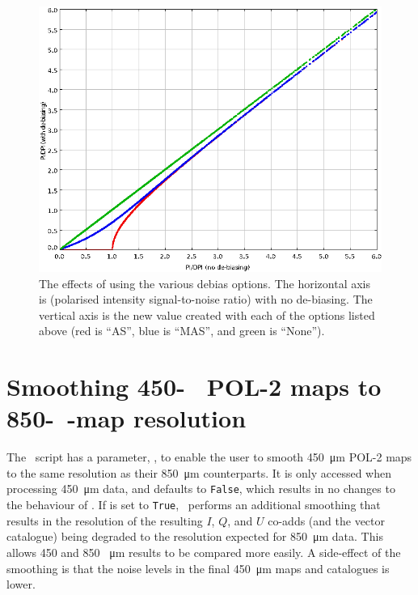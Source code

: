 \begin{figure}[ht!]
\begin{center}
\includegraphics[width=0.8\linewidth]{sc22-poledit-debias.png}
\caption [The effects of using the various  debias options]{
  The effects of using the various  debias options. The horizontal axis
  is  (polarised intensity signal-to-noise ratio) with no de-biasing. The vertical
  axis is the new  value created with each of the  options listed
  above (red is ``AS'', blue is ``MAS'', and green is ``None'').
\label{fig:poleditdebias-1}
}
\end{center}
\end{figure}


\section{Smoothing 450-\SI{}{\textbf{\micro\metre}}
POL-2 maps to 850-\SI{}{\textbf{\micro\metre}}-map resolution}

The \poltwomap\ script has a parameter, , to enable the user to smooth
\SI{450}{\micro\metre} POL-2 maps to the same resolution as their \SI{850}{\micro\metre}
counterparts. It is only accessed when processing \SI{450}{\micro\metre} data, and defaults
to \texttt{False}, which results in no changes to the behaviour of \poltwomap. If
 is set to \texttt{True}, \poltwomap\ performs an additional smoothing
that results in the resolution of the resulting
$I$, $Q$, and $U$ co-adds (and the vector catalogue) being degraded to the resolution expected
for \SI{850}{\micro\metre} data. This allows 450 and 850 \SI{}{\micro\metre} results to be
compared more easily. A side-effect of the smoothing is that the noise
levels in the final \SI{450}{\micro\metre} maps and catalogues is lower.

